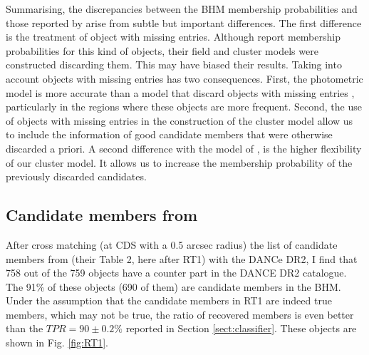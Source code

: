 Summarising, the discrepancies between the BHM membership probabilities and those reported by \citet{Bouy2015} arise from subtle but important differences. The first difference is the treatment of object with missing entries. Although  \citet{Bouy2015} report membership probabilities for this kind of objects, their field and cluster models were constructed discarding them. This may have biased their results. Taking into account objects with missing entries has two consequences. First, the photometric model is more accurate than a model that discard objects with missing entries , particularly in the regions where these objects are more frequent. Second, the use of objects with missing entries in the construction of the cluster model allow us to include the information of good candidate members that were otherwise discarded a priori. A second difference with the model of \citet{Bouy2015}, is the higher flexibility of our cluster model. It allows us to increase the membership probability of the previously discarded candidates. 

\subsection{Candidate members from \citet{Rebull2016}}
\label{sect:comparisonRebull}

After cross matching (at CDS with a 0.5 arcsec radius) the list of candidate members from \citet{Rebull2016} (their Table 2, here after RT1) with the DANCe DR2, I find that 758 out of the 759 objects have a counter part in the DANCE DR2 catalogue. The 91\% of these objects (690 of them) are candidate members in the BHM. Under the assumption that the candidate members in RT1 are indeed true members, which may not be true, the ratio of recovered members is even better than the $TPR=90\pm0.2\%$ reported in Section \ref{sect:classifier}. These objects are shown in Fig. \ref{fig:RT1}.

